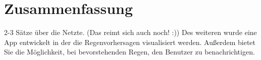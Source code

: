 \section*{Zusammenfassung}
2-3 Sätze über die Netzte. (Das reimt sich auch noch! :))
Des weiteren wurde eine App entwickelt in der die Regenvorhersagen visualisiert werden. 
Außerdem bietet Sie die Möglichkeit, bei bevorstehenden Regen, den Benutzer zu benachrichtigen. 